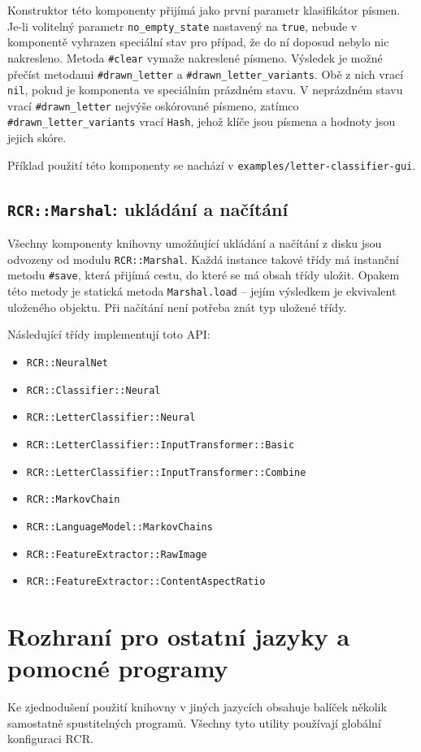 \documentclass[a4paper]{article}
\begin{document}
Konstruktor této komponenty přijímá jako první parametr klasifikátor písmen.
Je-li volitelný parametr \texttt{no\_empty\_state} nastavený na \texttt{true},
nebude v komponentě vyhrazen speciální stav pro případ, že do ní doposud nebylo
nic nakresleno.
Metoda \texttt{\#clear} vymaže nakreslené písmeno. Výsledek je možné přečíst
metodami \texttt{\#drawn\_letter} a \texttt{\#drawn\_letter\_variants}.
Obě z nich vrací \texttt{nil}, pokud je komponenta ve speciálním prázdném stavu.
V neprázdném stavu vrací \texttt{\#drawn\_letter} nejvýše oskórované písmeno,
zatímco \texttt{\#drawn\_letter\_variants} vrací \texttt{Hash}, jehož klíče jsou
písmena a hodnoty jsou jejich skóre.

Příklad použití této komponenty se nachází v \texttt{examples/letter-classifier-gui}.

\subsection{\texttt{RCR::Marshal}: ukládání a načítání}
Všechny komponenty knihovny umožňující ukládání a načítání z disku jsou odvozeny
od modulu \texttt{RCR::Marshal}. Každá instance takové třídy má instanční metodu
\texttt{\#save}, která přijímá cestu, do které se má obsah třídy uložit. Opakem
této metody je statická metoda \texttt{Marshal.load} -- jejím výsledkem je
ekvivalent uloženého objektu. Při načítání není potřeba znát typ uložené třídy.

Následující třídy implementují toto API:
\begin{itemize}
\item \texttt{RCR::NeuralNet}
\item \texttt{RCR::Classifier::Neural}
\item \texttt{RCR::LetterClassifier::Neural}
\item \texttt{RCR::LetterClassifier::InputTransformer::Basic}
\item \texttt{RCR::LetterClassifier::InputTransformer::Combine}
\item \texttt{RCR::MarkovChain}
\item \texttt{RCR::LanguageModel::MarkovChains}
\item \texttt{RCR::FeatureExtractor::RawImage}
\item \texttt{RCR::FeatureExtractor::ContentAspectRatio}
\end{itemize}

\section{Rozhraní pro ostatní jazyky a pomocné programy}
Ke zjednodušení použití knihovny v jiných jazycích obsahuje balíček několik
samostatně spustitelných programů. Všechny tyto utility používají globální
konfiguraci RCR.
\end{document}
